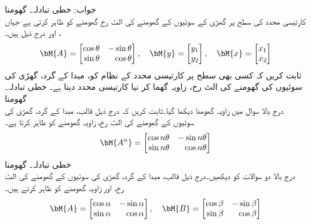 جواب: 
\quad خطی تبادلہ۔ گھومنا\\
کارتیسی محدد کی  سطح پر گھڑی کے سوئیوں کے گھومنے کی الٹ رخ گھومنے کو  ظاہر کرتی ہے جہاں ،  اور  درج ذیل ہیں۔
\begin{align*}
\bM{A}=\begin{bmatrix*}[r] \cos \theta&-\sin \theta\\ \sin \theta & \cos \theta \end{bmatrix*}, \quad \bM{y}=\begin{bmatrix} y_1\\ y_2 \end{bmatrix},\quad \bM{x}=\begin{bmatrix}x_1 \\ x_2  \end{bmatrix}
\end{align*}
ثابت کریں کہ  کسی بھی سطح پر  کارتیسی محدد کے نظام کو، مبدا کے گرد،  گھڑی کی سوئیوں کی گھومنے کی الٹ رخ،   زاویہ گھما کر نیا کارتیسی محدد  دیتا ہے۔
\quad خطی تبادلہ۔ گھومنا\\
درج بالا سوال میں  زاویہ گھومنا دیکھا گیا۔ثابت کریں کہ درج ذیل قالب، مبدا کے گرد، گھڑی کی سوئیوں کے گھومنے  کی الٹ رخ،   زاویہ گھومنے کو ظاہر کرتا ہے۔ 
\begin{align*}
\bM{A^n}=\begin{bmatrix*}[r] \cos n\theta&-\sin n\theta\\ \sin n\theta & \cos n\theta \end{bmatrix*}
\end{align*}
\quad خطی تبادلہ۔ گھومنا\\
درج بالا دو سوالات کو دیکھیں۔درج ذیل قالب، مبدا کے گرد، گھڑی کی سوئیوں کے گھومنے  کی الٹ رخ،  اور  زاویہ گھومنے کو ظاہر کرتے ہیں۔
\begin{align*}
\bM{A}=\begin{bmatrix*}[r] \cos \alpha&-\sin \alpha\\ \sin \alpha & \cos \alpha \end{bmatrix*}, \quad \bM{B}=\begin{bmatrix*}[r] \cos \beta&-\sin \beta\\ \sin \beta & \cos \beta \end{bmatrix*}
\end{align*}
